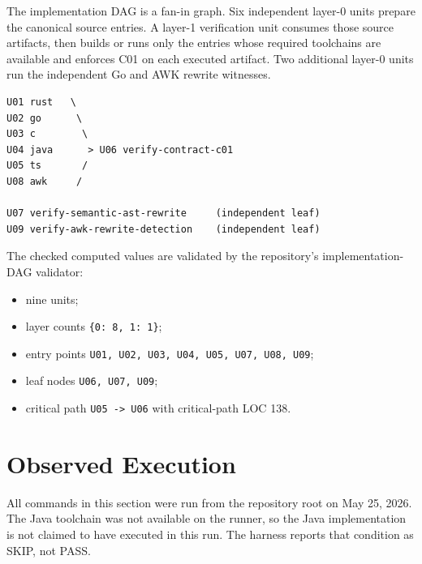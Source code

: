 \documentclass[11pt,letterpaper]{article}
\begin{document}
The implementation DAG is a fan-in graph. Six independent layer-0 units
prepare the canonical source entries. A layer-1 verification unit
consumes those source artifacts, then builds or runs only the entries
whose required toolchains are available and enforces C01 on each
executed artifact. Two additional layer-0 units run the independent Go
and AWK rewrite witnesses.

\begin{lstlisting}
U01 rust   \
U02 go      \
U03 c        \
U04 java      > U06 verify-contract-c01
U05 ts       /
U08 awk     /

U07 verify-semantic-ast-rewrite     (independent leaf)
U09 verify-awk-rewrite-detection    (independent leaf)
\end{lstlisting}

The checked computed values are validated by the repository's
implementation-DAG validator:

\begin{itemize}
  \item nine units;
  \item layer counts \texttt{\{0: 8, 1: 1\}};
  \item entry points \texttt{U01, U02, U03, U04, U05, U07, U08, U09};
  \item leaf nodes \texttt{U06, U07, U09};
  \item critical path \texttt{U05 -> U06} with critical-path LOC 138.
\end{itemize}

\section{Observed Execution}

All commands in this section were run from the repository root on
May 25, 2026. The Java toolchain was not available on the runner, so
the Java implementation is not claimed to have executed in this run.
The harness reports that condition as SKIP, not PASS.
\end{document}
